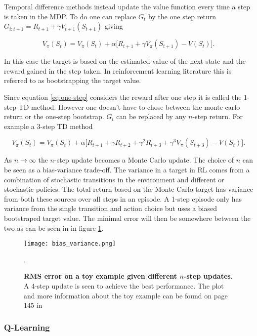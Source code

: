 Temporal difference methods instead update the value function every time a step is taken in the MDP. To do one can replace $G_t$ by the one step return $G_{t:t+1} = R_{t+1} + \gamma V_{t+1}(S_{t+1})$ giving

\begin{equation}
    V_\pi(S_t) = V_\pi(S_t) + \alpha \big[R_{t+1} + \gamma V_\pi(S_{t+1}) - V(S_t)\big].
    \label{eq:one-step}
\end{equation}

In this case the target is based on the estimated value of the next state and the reward gained in the step taken. In reinforcement learning literature this is referred to as bootstrapping the target value.

Since equation \ref{eq:one-step} considers the reward after one step it is called the 1-step TD method. However one doesn't have to chose between the monte carlo return or the one-step bootstrap. $G_t$ can be replaced by any $n$-step return. For example a 3-step TD method

\begin{equation}
    V_\pi(S_t) = V_\pi(S_t) + \alpha \big[R_{t+1} + \gamma R_{t+2} + \gamma^2 R_{t+3} + \gamma^3V_\pi(S_{t+3}) - V(S_t)\big].
\end{equation}

As $n\rightarrow\infty$ the $n$-step update becomes a Monte Carlo update. The choice of $n$ can be seen as a bias-variance trade-off. The variance in a target in RL comes from a combination of stochastic transitions in the environment and different or stochastic policies. The total return based on the Monte Carlo target has variance from both these sources over all steps in an episode. A 1-step episode only has variance from the single transition and action choice but uses a biased bootstraped target value. The minimal error will then be somewhere between the two as can be seen in in figure \ref{fig:bias-variance}.

\begin{figure}[H] %
    \centering
    \texttt{[image: bias\_variance.png]}
    \captionsetup{width=.7\textwidth}
    \caption{\textbf{RMS error on a toy example given different $n$-step updates}. A 4-step update is seen to achieve the best performance. The plot and more information about the toy example can be found on page 145 in \cite{sutton_barto_2018}}.
    \label{fig:bias-variance}
\end{figure}

\subsubsection{Q-Learning}

